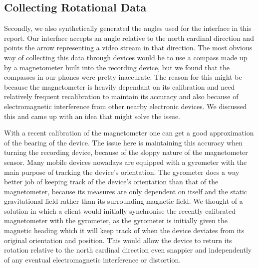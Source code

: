 \subsection{Collecting Rotational Data}
\label{sec:collectingrotationaldata}
Secondly, we also synthetically generated the angles used for the interface in this report. Our interface accepts an angle relative to the north cardinal direction and points the arrow representing a video stream in that direction. The most obvious way of collecting this data through devices would be to use a compass made up by a magnetometer built into the recording device, but we found that the compasses in our phones were pretty inaccurate. The reason for this might be because the magnetometer is heavily dependant on its calibration and need relatively frequent recalibration to maintain its accuracy and also because of electromagnetic interference from other nearby electronic devices. We discussed this and came up with an idea that might solve the issue.

With a recent calibration of the magnetometer one can get a good approximation of the bearing of the device. The issue here is maintaining this accuracy when turning the recording device, because of the sloppy nature of the magnetometer sensor. Many mobile devices nowadays are equipped with a gyrometer with the main purpose of tracking the device’s orientation. The gyrometer does a way better job of keeping track of the device’s orientation than that of the magnetometer, because its measures are only dependent on itself and the static gravitational field rather than its surrounding magnetic field. We thought of a solution in which a client would initially synchronise the recently calibrated magnetometer with the gyrometer, as the gyrometer is initially given the magnetic heading which it will keep track of when the device deviates from its original orientation and position. This would allow the device to return its rotation relative to the north cardinal direction even snappier and independently of any eventual electromagnetic interference or distortion. 

